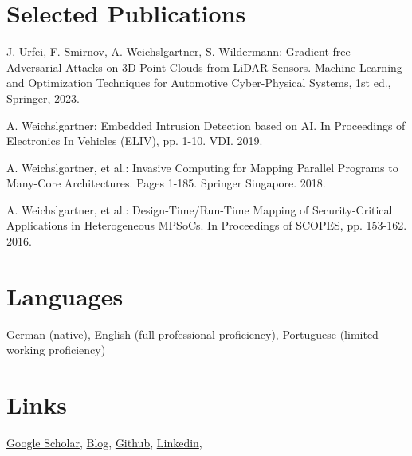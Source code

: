 \documentclass[11pt,a4paper, sans, colorlinks, linkcolor=true]{moderncv}
\begin{document}
\section{Selected Publications} 
\begin{itemize}
{\footnotesize	\item J. Urfei, F. Smirnov, A. Weichslgartner, S. Wildermann: Gradient-free Adversarial Attacks on 3D Point Clouds from LiDAR Sensors. Machine Learning and Optimization Techniques for Automotive Cyber-Physical Systems, 1st ed., Springer, 2023.
	\item A. Weichslgartner: Embedded Intrusion Detection based on AI. In Proceedings of Electronics In Vehicles (ELIV), pp. 1-10. VDI. 2019.
	\item A. Weichslgartner, et al.: Invasive Computing for Mapping Parallel Programs to Many-Core Architectures. Pages 1-185. Springer Singapore. 2018.
	\item A. Weichslgartner, et al.: Design-Time/Run-Time Mapping of Security-Critical Applications in Heterogeneous MPSoCs. In Proceedings of SCOPES, pp. 153-162. 2016.}
\end{itemize}


\section{Languages}
German (native), English (full professional proficiency), Portuguese (limited working proficiency)




\section{Links}
\href{https://scholar.google.com/citations?user=qJzMnhUAAAAJ}{Google Scholar}, \href{https://weichslgartner.github.io}{Blog}, \href{https://github.com/weichslgartner}{Github}, \href{https://linkedin.com/in/andreas-weichslgartner}{Linkedin},
 
\end{document}

